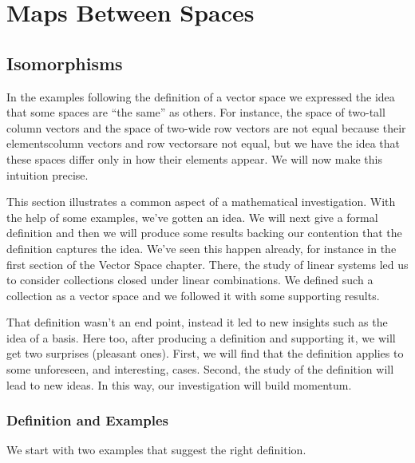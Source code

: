 \chapter{Maps Between Spaces}

\section{Isomorphisms}
In the examples following the definition of a vector space
we expressed the idea that some spaces are ``the same'' as others.
For instance, the space of two-tall column vectors and
the space of two-wide row vectors
are not equal because their 
elements\Dash column vectors and row vectors\Dash are 
not equal, but we have 
the idea that these spaces differ only in how their elements appear.
We will now make this intuition precise.

This section illustrates a common aspect of a mathematical investigation.
With the help of some examples, we've gotten an idea.
We will next give a formal definition and then
we will produce some results backing our contention 
that the definition captures the idea.
We've seen this happen already, 
for instance in the first section of the Vector Space chapter.
There, the study of linear systems
led us to consider collections closed under linear combinations.
We defined such a collection as a vector space and
we followed it with some supporting results.

That definition wasn't an end point, 
instead it led to new insights such as the idea of a basis.
Here too, after producing a definition and supporting it,
we will get two surprises (pleasant ones).
First, we will find that 
the definition applies to some unforeseen, and interesting, cases.
Second, the study of the definition will lead to new ideas.
In this way, our investigation will build momentum.










\subsection{Def{}inition and Examples}
We start with two examples
that suggest the right definition. 

